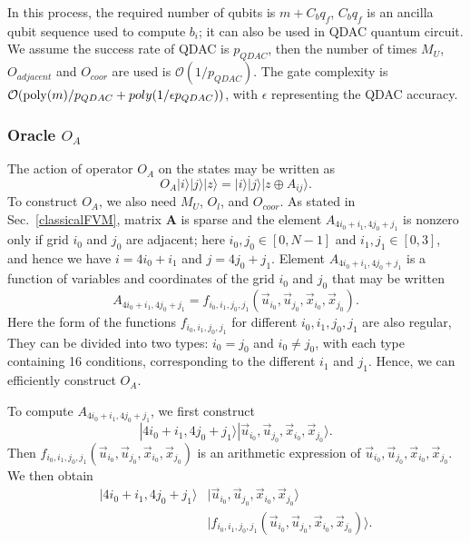 \documentclass[%
 reprint,
 amsmath,amssymb,
pra,
]{revtex4-1}
\begin{document}
In this process, the required number of qubits is $m+C_bq_f$, $C_bq_f$ is an ancilla qubit sequence used to compute $b_i$; it can also be used in QDAC quantum circuit. We assume the success rate of QDAC is $p_{QDAC}$, then the number of times $M_U$, $O_{adjacent}$ and $O_{coor}$ are used is $\mathcal{O}(1/p_{QDAC})$. The gate complexity is $\mathcal{O}({\rm poly}(m)/p_{QDAC}+poly(1/\epsilon p_{QDAC}))$, with $\epsilon$ representing the QDAC accuracy.

\subsubsection{Oracle $O_A$}
The action of operator $O_A$ on the states may be written as
\begin{equation}
O_A|i\rangle|j\rangle|z\rangle=|i\rangle|j\rangle|z\oplus A_{ij}\rangle.
\end{equation}
To construct $O_A$, we also need $M_U$, $O_l$, and $O_{coor}$. As stated in Sec.~\ref{classicalFVM}, matrix $\bm{A}$ is sparse and the element $A_{4i_0+i_1,4j_0+j_1} $ is nonzero only if grid $i_0$ and $j_0$ are adjacent; here $i_0,j_0\in[0,N-1]$ and $i_1,j_1\in[0,3]$, and hence we have $i=4i_0+i_1$ and $j=4j_0+j_1$. Element $A_{4i_0+i_1,4j_0+j_1}$ is a function of variables and coordinates of the grid $i_0$ and $j_0$ that may be written
\begin{equation}
A_{4i_0+i_1,4j_0+j_1}=f_{i_0,i_1,j_0,j_1}
(\vec{u}_{i_0},\vec{u}_{j_0},\vec{x}_{i_0},\vec{x}_{j_0}).
\end{equation}
Here the form of the functions $f_{i_0,i_1,j_0,j_1}$ for different $i_0,i_1,j_0,j_1$ are also regular, They can be divided into two types: $i_0=j_0$ and $i_0\neq j_0$, with each type containing 16 conditions, corresponding to the different $i_1$ and $j_1$. Hence, we can efficiently construct $O_A$.

To compute $A_{4i_0+i_1,4j_0+j_1}$, we first construct
\begin{equation}
|4i_0+i_1,4j_0+j_1\rangle|\vec{u}_{i_0},\vec{u}_{j_0},\vec{x}_{i_0},\vec{x}_{j_0}\rangle.
\end{equation}
Then $f_{i_0,i_1,j_0,j_1}(\vec{u}_{i_0},\vec{u}_{j_0},\vec{x}_{i_0},\vec{x}_{j_0})$ is an arithmetic expression of $\vec{u}_{i_0},\vec{u}_{j_0},\vec{x}_{i_0},\vec{x}_{j_0}$. We then obtain
\begin{equation}
\begin{aligned}
|4i_0+i_1,4j_0+j_1\rangle&|\vec{u}_{i_0},\vec{u}_{j_0},\vec{x}_{i_0},\vec{x}_{j_0}\rangle\\
&|f_{i_0,i_1,j_0,j_1}(\vec{u}_{i_0},\vec{u}_{j_0},\vec{x}_{i_0},\vec{x}_{j_0})\rangle.
\end{aligned} 
\end{equation}
\end{document}
